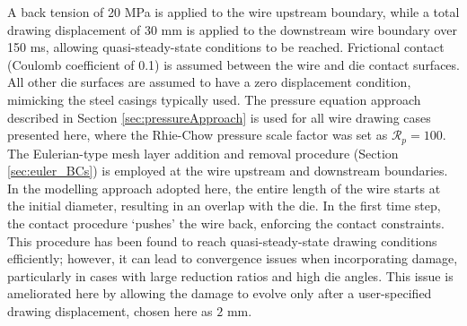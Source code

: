 \documentclass[sn-mathphys,Numbered]{sn-jnl}%
\begin{document}
A back tension of 20 MPa is applied to the wire upstream boundary, while a total drawing displacement of 30 mm is applied to the downstream wire boundary over 150 ms, allowing quasi-steady-state conditions to be reached.
Frictional contact (Coulomb coefficient of 0.1) is assumed between the wire and die contact surfaces.
All other die surfaces are assumed to have a zero displacement condition, mimicking the steel casings typically used.
The pressure equation approach described in Section \ref{sec:pressureApproach} is used for all wire drawing cases presented here, where the Rhie-Chow pressure scale factor was set as $\mathcal{R}_p = 100$.
The Eulerian-type mesh layer addition and removal procedure (Section \ref{sec:euler_BCs}) is employed at the wire upstream and 
downstream boundaries.
In the modelling approach adopted here, the entire length of the wire starts at the initial diameter, resulting in an overlap with the die.
In the first time step, the contact procedure `pushes' the wire back, enforcing the contact constraints.
This procedure has been found to reach quasi-steady-state drawing conditions efficiently; however,
it can lead to convergence issues when incorporating damage, particularly in cases with large reduction ratios and high die angles. %
This issue is ameliorated here by allowing the damage to evolve only after a user-specified drawing displacement, chosen here as $2$ mm.
\end{document}
